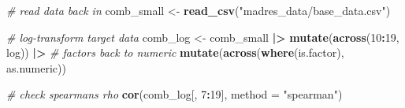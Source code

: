 \documentclass[12pt, twoside]{amherstthesis}
\newenvironment{Shaded}{\begin{snugshade}}{\end{snugshade}}
\newcommand{\AttributeTok}[1]{\textcolor[rgb]{0.13,0.29,0.53}{#1}}
\newcommand{\CommentTok}[1]{\textcolor[rgb]{0.56,0.35,0.01}{\textit{#1}}}
\newcommand{\DecValTok}[1]{\textcolor[rgb]{0.00,0.00,0.81}{#1}}
\newcommand{\FunctionTok}[1]{\textcolor[rgb]{0.13,0.29,0.53}{\textbf{#1}}}
\newcommand{\NormalTok}[1]{#1}
\newcommand{\OtherTok}[1]{\textcolor[rgb]{0.56,0.35,0.01}{#1}}
\newcommand{\SpecialCharTok}[1]{\textcolor[rgb]{0.81,0.36,0.00}{\textbf{#1}}}
\newcommand{\StringTok}[1]{\textcolor[rgb]{0.31,0.60,0.02}{#1}}
\begin{document}
\scriptsize
\begin{Shaded}
\begin{Highlighting}[]
\CommentTok{\# read data back in}
\NormalTok{comb\_small }\OtherTok{\textless{}{-}} \FunctionTok{read\_csv}\NormalTok{(}\StringTok{"madres\_data/base\_data.csv"}\NormalTok{)}

\CommentTok{\# log{-}transform target data}
\NormalTok{comb\_log }\OtherTok{\textless{}{-}}\NormalTok{ comb\_small }\SpecialCharTok{|\textgreater{}} 
  \FunctionTok{mutate}\NormalTok{(}\FunctionTok{across}\NormalTok{(}\DecValTok{10}\SpecialCharTok{:}\DecValTok{19}\NormalTok{, log)) }\SpecialCharTok{|\textgreater{}} 
  \CommentTok{\# factors back to numeric}
  \FunctionTok{mutate}\NormalTok{(}\FunctionTok{across}\NormalTok{(}\FunctionTok{where}\NormalTok{(is.factor), as.numeric))}

\CommentTok{\# check spearman\textquotesingle{}s rho}
\FunctionTok{cor}\NormalTok{(comb\_log[, }\DecValTok{7}\SpecialCharTok{:}\DecValTok{19}\NormalTok{], }\AttributeTok{method =} \StringTok{"spearman"}\NormalTok{)}
\end{Highlighting}
\end{Shaded}
\normalsize
\end{document}
